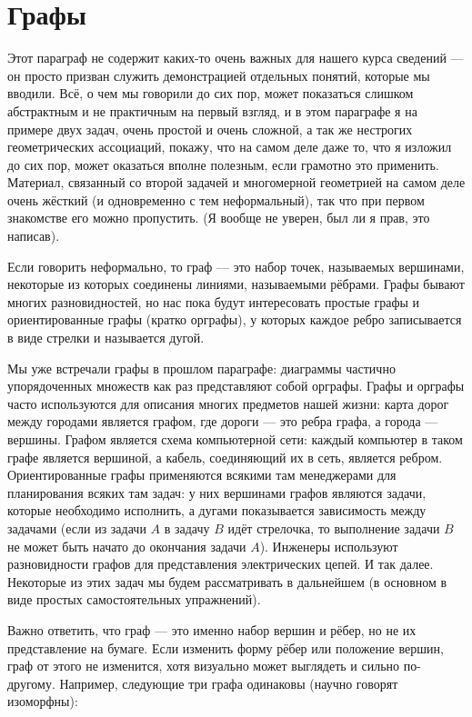 \section{Графы}

Этот параграф не содержит каких-то очень важных для нашего курса сведений — он просто призван служить демонстрацией отдельных понятий, которые мы вводили. Всё, о чем мы говорили до сих пор, может показаться слишком абстрактным и не практичным на первый взгляд, и в этом параграфе я на примере двух задач, очень простой и очень сложной, а так же нестрогих геометрических ассоциаций, покажу, что на самом деле даже то, что я изложил до сих пор, может оказаться вполне полезным, если грамотно это применить. Материал, связанный со второй задачей и многомерной геометрией на самом деле очень жёсткий (и одновременно с тем неформальный), так что при первом знакомстве его можно пропустить. (Я вообще не уверен, был ли я прав, это написав).

Если говорить неформально, то граф — это набор точек, называемых вершинами, некоторые из которых соединены линиями, называемыми рёбрами. Графы бывают многих разновидностей, но нас пока будут интересовать простые графы и ориентированные графы (кратко орграфы), у которых каждое ребро записывается в виде стрелки и называется дугой.

Мы уже встречали графы в прошлом параграфе: диаграммы частично упорядоченных множеств как раз представляют собой орграфы. Графы и орграфы часто используются для описания многих предметов нашей жизни: карта дорог между городами является графом, где дороги — это ребра графа, а города — вершины. Графом является схема компьютерной сети: каждый компьютер в таком графе является вершиной, а кабель, соединяющий их в сеть, является ребром. Ориентированные графы применяются всякими там менеджерами для планирования всяких там задач: у них вершинами графов являются задачи, которые необходимо исполнить, а дугами показывается зависимость между задачами (если из задачи $A$ в задачу $B$ идёт стрелочка, то выполнение задачи $B$ не может быть начато до окончания задачи $A$). Инженеры используют разновидности графов для представления электрических цепей. И так далее. Некоторые из этих задач мы будем рассматривать в дальнейшем (в основном в виде простых самостоятельных упражнений).

Важно ответить, что граф — это именно набор вершин и рёбер, но не их представление на бумаге. Если изменить форму рёбер или положение вершин, граф от этого не изменится, хотя визуально может выглядеть и сильно по-другому. Например, следующие три графа одинаковы (научно говорят изоморфны):

